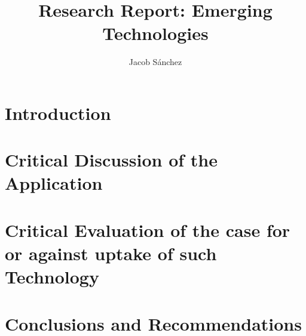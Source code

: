 \documentclass[a4paper,12pt]{article}
\title{Research Report: Emerging Technologies}
\author{Jacob Sánchez}
\date{}
\begin{document}
\maketitle


\section{Introduction}
\section{Critical Discussion of the Application}
\section{Critical Evaluation of the case for or against uptake of such Technology}
\section{Conclusions and Recommendations}
\end{document}
